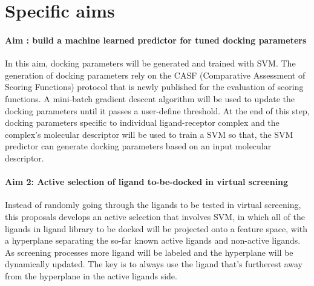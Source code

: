 

\section{Specific aims}

\paragraph{Aim : build a machine learned predictor for tuned docking parameters} 
In this aim, docking parameters will be generated and trained with SVM. 
The generation of docking parameters rely on the CASF (Comparative Assessment of Scoring Functions) protocol that is newly published for the evaluation of scoring functions.
A mini-batch gradient descent algorithm will be used to update the docking parameters until it passes a user-define threshold.
At the end of this step, docking parameters specific to individual  ligand-receptor complex and the complex's molecular descriptor will be used to train a SVM so that, the SVM predictor can generate docking parameters based on an input molecular descriptor.

\paragraph{Aim 2: Active selection of ligand to-be-docked in virtual screening}
Instead of randomly going through the ligands to be tested in virtual screening,
this proposals develops an active selection that involves SVM, in which all of the ligands in ligand library to be docked will be projected onto a feature space, with a hyperplane separating the so-far known active ligands and non-active ligands.
As screening processes more ligand will be labeled and the hyperplane will be dynamically updated. 
The key is to always use the ligand that's furtherest away from the hyperplane in the active ligands side.


